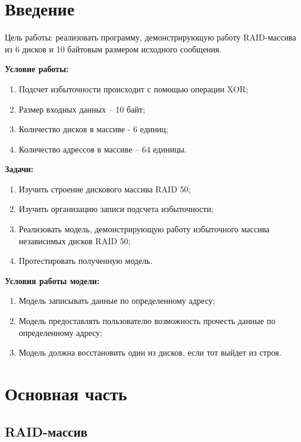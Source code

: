 \documentclass[10pt,a4paper,final]{article} %
\begin{document}
\tableofcontents

\newpage
\section* {Введение}

Цель работы: реализовать программу, демонстрирующую работу RAID-массива из 6 дисков и 10 байтовым размером исходного сообщения.

\textbf{Условие работы:}

\begin{enumerate}
	\item Подсчет избыточности  происходит с помощью  операции XOR;
	\item Размер входных данных -- 10 байт;
	\item Количество дисков в массиве - 6 единиц;
	\item Количество адрессов в массиве -- 64 единицы.
\end{enumerate}

\textbf{Задачи:}
\begin{enumerate}
	\item Изучить строение дискового массива RAID 50;
	\item Изучить организацию записи подсчета избыточности;
	\item Реализовать модель, демонстрирующую работу избыточного массива независимых дисков RAID 50;
	\item Протестировать полученную модель.
\end{enumerate}

\textbf{Условия работы модели:}
\begin{enumerate}
	\item Модель записывать данные по определенному адресу;
	\item Модель предоставлять пользователю возможность прочесть данные по определенному адресу;
	\item Модель должна восстановить один из дисков, если тот выйдет из строя.
\end{enumerate}


\newpage
\section{Основная часть}
\subsection{RAID-массив}
\end{document}
